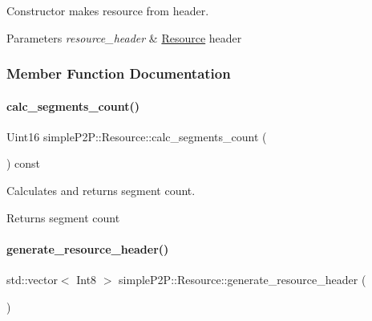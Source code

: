 Constructor makes resource from header. 


\begin{DoxyParams}{Parameters}
{\em resource\+\_\+header} & \hyperlink{classsimpleP2P_1_1Resource}{Resource} header \\
\hline
\end{DoxyParams}


\subsubsection{Member Function Documentation}
\mbox{\label{classsimpleP2P_1_1Resource_a4bbfde4d1e25c62ae4da0e6dfd64900b}} 
\paragraph{\texorpdfstring{calc\+\_\+segments\+\_\+count()}{calc\_segments\_count()}}
{\footnotesize\ttfamily Uint16 simple\+P2\+P\+::\+Resource\+::calc\+\_\+segments\+\_\+count (\begin{DoxyParamCaption}{ }\end{DoxyParamCaption}) const\hspace{0.3cm}{\ttfamily [inline]}}



Calculates and returns segment count. 

\begin{DoxyReturn}{Returns}
segment count 
\end{DoxyReturn}
\mbox{\label{classsimpleP2P_1_1Resource_ad2f3883ae1993c7788aecf34b8fb8470}} 
\paragraph{\texorpdfstring{generate\+\_\+resource\+\_\+header()}{generate\_resource\_header()}}
{\footnotesize\ttfamily std\+::vector$<$ Int8 $>$ simple\+P2\+P\+::\+Resource\+::generate\+\_\+resource\+\_\+header (\begin{DoxyParamCaption}{ }\end{DoxyParamCaption})}



